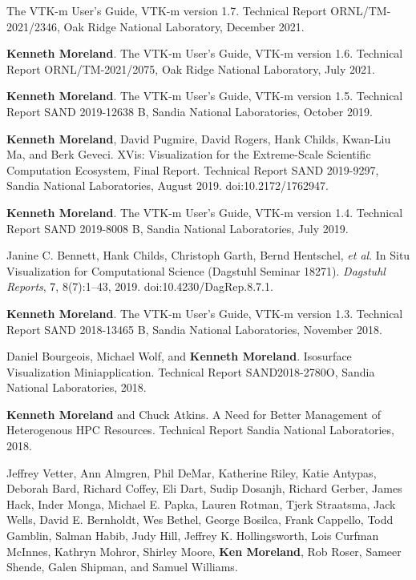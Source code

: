 \begin{enumerate}[label={[\arabic*]}, left=0pt]
  The {VTK-m} User's Guide, {VTK-m} version 1.7.
Technical Report ORNL/TM-2021/2346, Oak Ridge National Laboratory, December 2021.
\item  %
  \textbf{Kenneth Moreland}.
  The {VTK-m} User's Guide, {VTK-m} version 1.6.
Technical Report ORNL/TM-2021/2075, Oak Ridge National Laboratory, July 2021.
\item  %
  \textbf{Kenneth Moreland}.
  The {VTK-m} User's Guide, {VTK-m} version 1.5.
Technical Report SAND 2019-12638 B, Sandia National Laboratories, October 2019.
\item  %
  \textbf{Kenneth Moreland}, David Pugmire, David Rogers, Hank Childs, Kwan-Liu Ma, and Berk Geveci.
  {XVis}: Visualization for the Extreme-Scale Scientific Computation Ecosystem, Final Report.
Technical Report SAND 2019-9297, Sandia National Laboratories, August 2019.
  doi:10.2172/1762947.
\item  %
  \textbf{Kenneth Moreland}.
  The {VTK-m} User's Guide, {VTK-m} version 1.4.
Technical Report SAND 2019-8008 B, Sandia National Laboratories, July 2019.
\item  %
  Janine C. Bennett, Hank Childs, Christoph Garth, Bernd Hentschel, \emph{et al}.
  In Situ Visualization for Computational Science (Dagstuhl Seminar 18271).
  \emph{Dagstuhl Reports}, 7, 8(7):1--43, 2019.
  doi:10.4230/DagRep.8.7.1.
\item  %
  \textbf{Kenneth Moreland}.
  The {VTK-m} User's Guide, {VTK-m} version 1.3.
Technical Report SAND 2018-13465 B, Sandia National Laboratories, November 2018.
\item  %
  Daniel Bourgeois, Michael Wolf, and \textbf{Kenneth Moreland}.
  Isosurface Visualization Miniapplication.
Technical Report SAND2018-2780O, Sandia National Laboratories, 2018.
\item  %
  \textbf{Kenneth Moreland} and Chuck Atkins.
  A Need for Better Management of Heterogenous HPC Resources.
Technical Report Sandia National Laboratories, 2018.
\item  %
  Jeffrey Vetter, Ann Almgren, Phil DeMar, Katherine Riley, Katie Antypas, Deborah Bard, Richard Coffey, Eli Dart, Sudip Dosanjh, Richard Gerber, James Hack, Inder Monga, Michael E. Papka, Lauren Rotman, Tjerk Straatsma, Jack Wells, David E. Bernholdt, Wes Bethel, George Bosilca, Frank Cappello, Todd Gamblin, Salman Habib, Judy Hill, Jeffrey K. Hollingsworth, Lois Curfman McInnes, Kathryn Mohror, Shirley Moore, \textbf{Ken Moreland}, Rob Roser, Sameer Shende, Galen Shipman, and Samuel Williams.

\end{enumerate}
